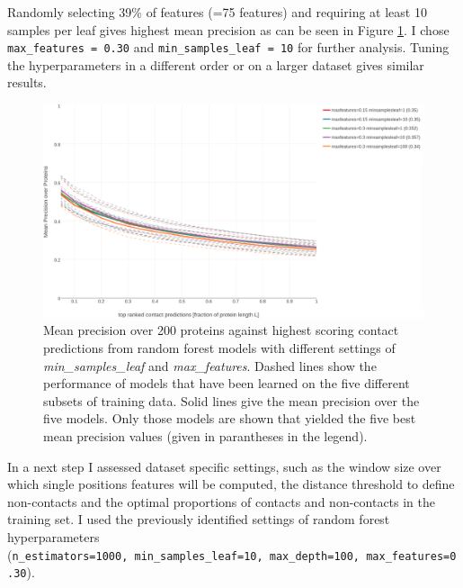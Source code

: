 \documentclass[12pt,a4paper,twoside]{book}
\theoremstyle{definition}
\theoremstyle{definition}
\theoremstyle{remark}
\begin{document}
Randomly selecting 39\% of features (=75 features) and requiring at
least 10 samples per leaf gives highest mean precision as can be seen in
Figure \ref{fig:rf-gridsearch-maxdepth-minsampleleaf}. I chose
\texttt{max\_features\ =\ 0.30} and \texttt{min\_samples\_leaf\ =\ 10}
for further analysis. Tuning the hyperparameters in a different order or
on a larger dataset gives similar results.










\begin{figure}

{\centering \includegraphics[width=1\linewidth]{img/random_forest_contact_prior/new_gridsearch/precision_vs_rank_cv_on_test_random_forest_maxfeatures_minsampleleaf_top5_notitle} 

}

\caption{Mean precision over 200
proteins against highest scoring contact predictions from random forest
models with different settings of \emph{min\_samples\_leaf} and
\emph{max\_features}. Dashed lines show the performance of models that
have been learned on the five different subsets of training data. Solid
lines give the mean precision over the five models. Only those models
are shown that yielded the five best mean precision values (given in
parantheses in the legend).}\label{fig:rf-gridsearch-maxdepth-minsampleleaf}
\end{figure}

In a next step I assessed dataset specific settings, such as the window
size over which single positions features will be computed, the distance
threshold to define non-contacts and the optimal proportions of contacts
and non-contacts in the training set. I used the previously identified
settings of random forest hyperparameters
(\texttt{n\_estimators=1000,\ min\_samples\_leaf=10,\ max\_depth=100,\ max\_features=0.30}).
\end{document}
